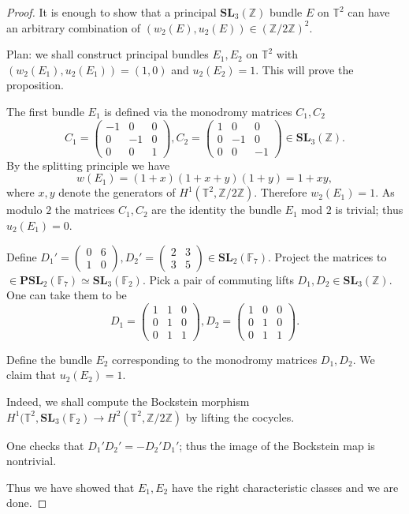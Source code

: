 \documentclass[a4paper]{article}
\newcommand{\SL}{\mathbf{SL}_3(\mathbb{Z})}        %
\begin{document}
\begin{proof}
It is enough to show that a principal $\SL$ bundle $E$ on $\mathbb{T}^2$ can have an arbitrary combination of $(w_2(E), u_2(E)) \in (\mathbb{Z}/ 2\mathbb{Z})^2$.

Plan: we shall construct principal bundles $E_1, E_2$ on $\mathbb{T}^2$ with $(w_2(E_1), u_2(E_1)) = (1, 0)$ and $u_2(E_2) = 1$.
This will prove the proposition.

The first bundle $E_1$ is defined via the monodromy matrices $C_1, C_2$
\[
C_1 = 
\begin{pmatrix}
-1 & 0 & 0 \\
0 & -1 & 0 \\
0 & 0 & 1
\end{pmatrix}
,
C_2 =
\begin{pmatrix}
1 & 0 & 0 \\
0 & -1 & 0 \\
0 & 0 & -1
\end{pmatrix} \in \SL
.\] 
By the splitting principle we have
\[
w(E_1)
= (1 + x) (1 + x + y) (1 + y) 
= 1 + xy
,\] 
where $x, y$ denote the generators of $H^1(\mathbb{T}^2, \mathbb{Z}/ 2 \mathbb{Z})$.
Therefore $w_2(E_1) = 1$.
As modulo $2$ the matrices $C_1, C_2$ are the identity the bundle $E_1$ mod $2$ is trivial; thus $u_2(E_1) = 0$.

Define $D_1' = 
\left( \begin{smallmatrix}0&6\\1&0\end{smallmatrix}\right) 
, D_2' =
\left( \begin{smallmatrix}2&3\\3&5\end{smallmatrix}\right)
\in \mathbf{SL}_2(\mathbb{F}_7)$.
Project the matrices to 
$\in \mathbf{PSL}_2(\mathbb{F}_7) \simeq \mathbf{SL}_3(\mathbb{F}_2) $.
Pick a pair of commuting lifts $D_1, D_2 \in \mathbf{SL}_3(\mathbb{Z})$.
One can take them to be 
\begin{equation}
D_1 = 
\begin{pmatrix}
1 & 1 & 0 \\
0 & 1 & 0 \\
0 & 1 & 1
\end{pmatrix}, 
D_2 =
\begin{pmatrix}
1 & 0 & 0 \\
0 & 1 & 0 \\
0 & 1 & 1
\end{pmatrix}
.\end{equation}

Define the bundle $E_2$ corresponding to the monodromy matrices $D_1, D_2$. 
We claim that $u_2(E_2) = 1$.

Indeed, we shall compute the Bockstein morphism $H^1(\mathbb{T}^2, \mathbf{SL}_3(\mathbb{F}_2) \to H^2(\mathbb{T}^2, \mathbb{Z}/ 2 \mathbb{Z})$ by lifting the cocycles.

One checks that $D_1' D_2' = - D_2' D_1'$; thus the image of the Bockstein map is nontrivial.

Thus we have showed that $E_1, E_2$ have the right characteristic classes and we are done.
\end{proof}
\end{document}
